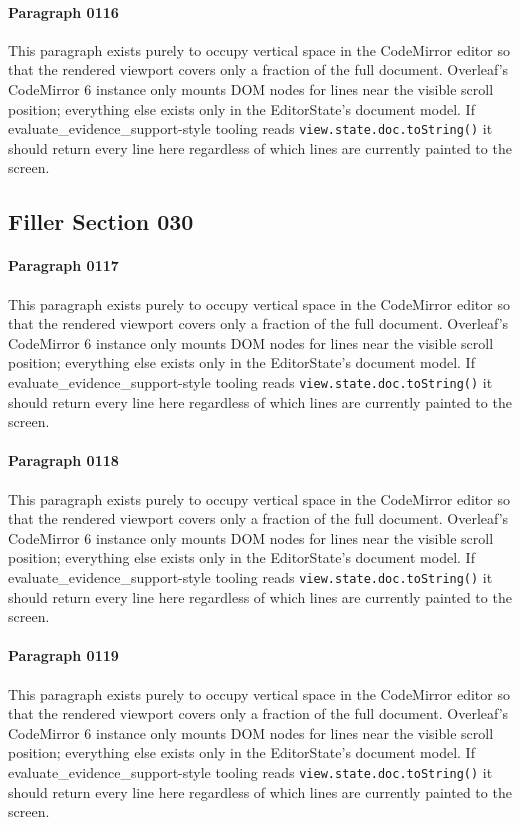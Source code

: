 \documentclass{article}
\begin{document}
\paragraph{Paragraph 0116}
This paragraph exists purely to occupy vertical space in the CodeMirror editor so that the rendered viewport covers only a fraction of the full document. Overleaf's CodeMirror 6 instance only mounts DOM nodes for lines near the visible scroll position; everything else exists only in the EditorState's document model. If evaluate\_evidence\_support-style tooling reads \texttt{view.state.doc.toString()} it should return every line here regardless of which lines are currently painted to the screen.

\subsection{Filler Section 030}
\paragraph{Paragraph 0117}
This paragraph exists purely to occupy vertical space in the CodeMirror editor so that the rendered viewport covers only a fraction of the full document. Overleaf's CodeMirror 6 instance only mounts DOM nodes for lines near the visible scroll position; everything else exists only in the EditorState's document model. If evaluate\_evidence\_support-style tooling reads \texttt{view.state.doc.toString()} it should return every line here regardless of which lines are currently painted to the screen.

\paragraph{Paragraph 0118}
This paragraph exists purely to occupy vertical space in the CodeMirror editor so that the rendered viewport covers only a fraction of the full document. Overleaf's CodeMirror 6 instance only mounts DOM nodes for lines near the visible scroll position; everything else exists only in the EditorState's document model. If evaluate\_evidence\_support-style tooling reads \texttt{view.state.doc.toString()} it should return every line here regardless of which lines are currently painted to the screen.

\paragraph{Paragraph 0119}
This paragraph exists purely to occupy vertical space in the CodeMirror editor so that the rendered viewport covers only a fraction of the full document. Overleaf's CodeMirror 6 instance only mounts DOM nodes for lines near the visible scroll position; everything else exists only in the EditorState's document model. If evaluate\_evidence\_support-style tooling reads \texttt{view.state.doc.toString()} it should return every line here regardless of which lines are currently painted to the screen.
\end{document}
